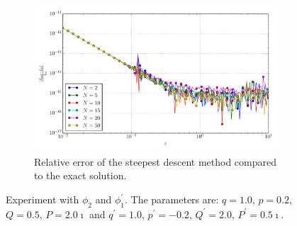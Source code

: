 \documentclass[a4paper,10pt]{article}
\begin{document}
\begin{figure}[ht!]
\begin{subfigure}[t]{0.5\linewidth}
    \includegraphics[width=\linewidth]{./plots/tp_1d_conv_eps_2_1_err_rel_nsd.pdf}
    \caption{Relative error of the steepest descent method compared to the exact solution.}
    \label{fig:tp_1d_conv_eps_2_1_err_rel_nsd}
  \end{subfigure}
  \label{fig:tp_1d_conv_eps_2_1}
  \caption{Experiment with $\phi_{2}$ and $\phi_{1}^{\prime}$.
  The parameters are:
  $q=1.0$, $p=0.2$, $Q=0.5$, $P=2.0\imath$ and
  $q^\prime=1.0$, $p^\prime=-0.2$, $Q^\prime=2.0$, $P^\prime=0.5\imath$.}
\end{figure}
\end{document}
